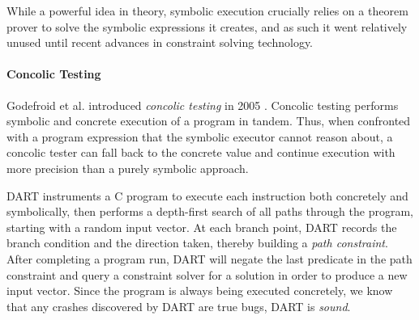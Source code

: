 While a powerful idea in theory, symbolic execution crucially relies on
a theorem prover to solve the symbolic expressions it creates, and as
such it went relatively unused until recent advances in constraint
solving technology.

\paragraph{Concolic Testing}
Godefroid et al. introduced \emph{concolic testing} in 2005
\cite{Godefroid2005-am}.
%
Concolic testing performs symbolic and concrete execution of a program
in tandem.
%
Thus, when confronted with a program expression that the symbolic
executor cannot reason about, a concolic tester can fall back to the
concrete value and continue execution with more precision than a purely
symbolic approach.

DART \cite{Godefroid2005-am} instruments a C program to execute
each instruction both concretely and symbolically, then performs a
depth-first search of all paths through the program, starting
with a random input vector.
%
At each branch point, DART records the branch condition and the
direction taken, thereby building a \emph{path constraint}.
%
%
After completing a program run, DART will negate the last predicate in
the path constraint and query a constraint solver for a solution
in order to produce a new input vector.
%
%
Since the program is always being executed concretely, we know
that any crashes discovered by DART are true bugs, \ie DART is
\emph{sound}.

